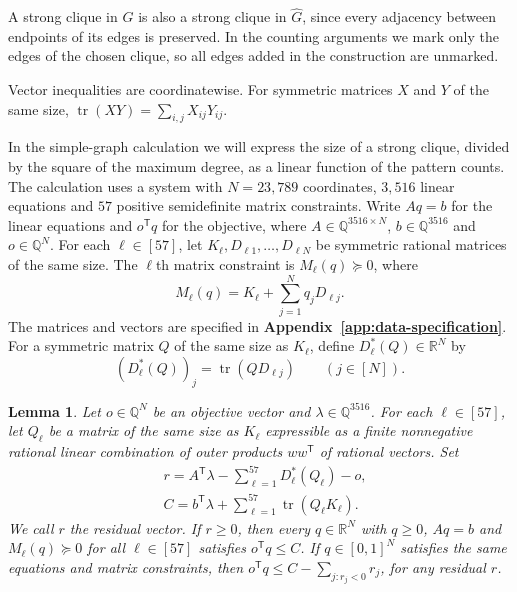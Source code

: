 \documentclass[preprint,11pt,numbers]{elsarticle-arxiv}
\numberwithin{equation}{section}
\newtheorem{lemma}[theorem]{Lemma}
\theoremstyle{definition}
\DeclareMathOperator{\tr}{tr}
\begin{document}
A strong clique in $G$ is also a strong clique in $\widehat G$, since
every adjacency between endpoints of its edges is preserved. In the
counting arguments we mark only the edges of the chosen clique, so
all edges added in the construction are unmarked.

Vector inequalities are coordinatewise. For symmetric matrices $X$
and $Y$ of the same size, $\tr(XY)=\sum_{i,j}X_{ij}Y_{ij}$.

In the simple-graph calculation we will express the size of a strong
clique, divided by the square of the maximum degree, as a linear
function of the pattern counts. The calculation uses a system with $N=23{,}789$ coordinates, $3{,}516$ linear equations and
$57$ positive semidefinite matrix constraints. Write $Aq=b$ for the
linear equations and $o^{\mathsf T}q$ for the objective, where
$A\in\mathbb Q^{3516\times N}$, $b\in\mathbb Q^{3516}$ and
$o\in\mathbb Q^N$. For each $\ell\in[57]$, let
$K_\ell,D_{\ell1},\ldots,D_{\ell N}$ be symmetric rational matrices of
the same size. The $\ell$th matrix constraint is $M_\ell(q)\succeq0$,
where
\begin{equation}\label{eq:intro-affine-gram}
 M_\ell(q)=K_\ell+\sum_{j=1}^N q_jD_{\ell j}.
\end{equation}
The matrices and vectors are specified in \textbf{Appendix~\ref{app:data-specification}}.
For a symmetric matrix
$Q$ of the same size as $K_\ell$, define
$D_\ell^*(Q)\in\mathbb R^N$ by
\begin{equation}\label{eq:intro-trace-adjoint}
 (D_\ell^*(Q))_j=\tr(QD_{\ell j})\qquad(j\in[N]).
\end{equation}

\begin{lemma}\label{prop:certificate-principle}
Let $o\in\mathbb Q^N$ be an objective vector and
$\lambda\in\mathbb Q^{3516}$. For each $\ell\in[57]$, let $Q_\ell$
be a matrix of the same size as $K_\ell$ expressible as a finite
nonnegative rational linear combination of outer products
$ww^{\mathsf T}$ of rational vectors. Set
\begin{align}
 &r=A^{\mathsf T}\lambda-\sum_{\ell=1}^{57}D_\ell^*(Q_\ell)-o,
 \label{eq:residual}\\
 &C=b^{\mathsf T}\lambda+\sum_{\ell=1}^{57}\tr(Q_\ell K_\ell).
 \label{eq:dual-value}
\end{align}
We call $r$ the residual vector. If $r\geq0$, then every $q\in\mathbb R^N$ with $q\geq0$, $Aq=b$ and
$M_\ell(q)\succeq0$ for all $\ell\in[57]$ satisfies $o^{\mathsf T}q\leq C$.
If $q\in[0,1]^N$ satisfies the same equations and matrix constraints,
then $o^{\mathsf T}q\leq C-\sum_{j:r_j<0}r_j$, for any residual $r$.
\end{lemma}
\end{document}
